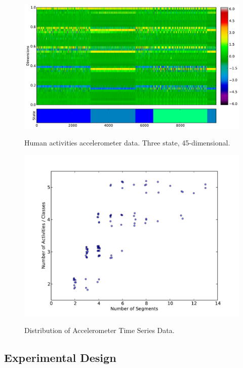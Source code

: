 \documentclass[letterpaper]{article}
\begin{document}
\begin{figure}[htbp]
  \caption{Human activities accelerometer data. Three state, 45-dimensional.}
  \centering
    \includegraphics[width=1.\linewidth]{images/accelerometer-data.pdf}
    \label{fig:accelerometer}
\end{figure}

\begin{figure}[htbp]
    \caption{Distribution of Accelerometer Time Series Data.}
  \centering
    \includegraphics[width=1.\linewidth]{images/distribution_of_dataset_segments.pdf}
    \label{fig:distribution}
\end{figure}

\subsection{Experimental Design}
\end{document}
